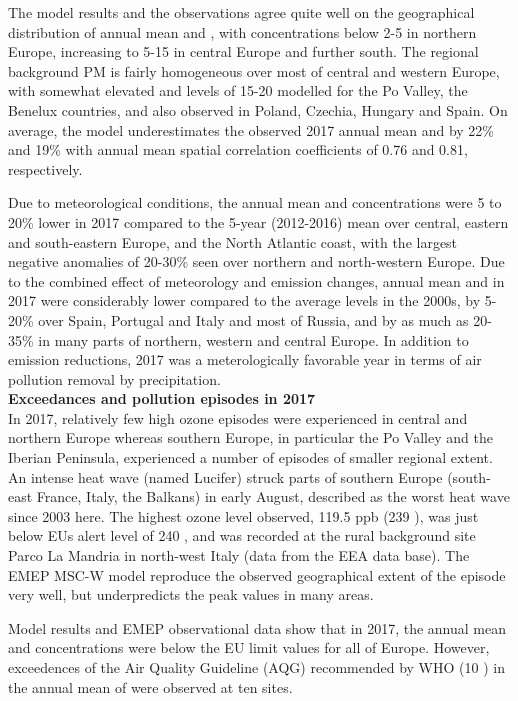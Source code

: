 The model results and the observations agree quite well on the geographical distribution of annual mean \PM[10] and
\PM[2.5], with concentrations below 2-5 \ug in northern Europe,
increasing to 5-15 \ug in central Europe and further south. The
regional background PM is fairly homogeneous over most of central and
western Europe, with somewhat elevated \PM[10] and \PM[2.5] levels of
15-20 \ug modelled for the Po Valley, the Benelux countries, and also observed
in Poland, Czechia, Hungary and Spain. On average, the model
underestimates the observed 2017 annual mean \PM[10] and \PM[2.5] by
22\% and 19\% with annual mean spatial correlation coefficients of 0.76 and 0.81,
respectively.

Due to meteorological conditions, the annual mean \PM[10] and \PM[2.5]
concentrations were 5 to 20\% lower in 2017 compared to the 5-year
(2012-2016) mean over central, eastern and south-eastern Europe, and
the North Atlantic coast, with the largest negative anomalies of
20-30\% seen over northern and north-western Europe. Due to the combined
effect of meteorology and emission changes, annual mean 
\PM[10] and \PM[2.5] in 2017 were considerably lower compared to the average
levels in the 2000s, by 5-20\% over Spain, Portugal and Italy and most
of Russia, and by as much as 20-35\% in many parts of northern,
western and central Europe. In addition to emission reductions, 
2017 was a meterologically favorable year in terms of air pollution
removal by precipitation.
\\

\noindent
\textbf{Exceedances and pollution episodes in 2017}\\  
In 2017, relatively few high ozone episodes were
experienced in central and northern Europe whereas southern Europe, in particular the Po Valley and the Iberian
Peninsula, experienced a number of episodes of smaller regional extent. An intense heat wave (named Lucifer) struck parts of southern Europe (south-east France, Italy, the Balkans) in early August, described as the worst heat wave since 2003 here. The highest ozone level observed, 119.5 ppb (239 \ug), was just below EUs alert level of 240 \ug, and was recorded at the rural background site Parco La Mandria in north-west Italy (data from the EEA data base).  The EMEP MSC-W model reproduce the observed geographical extent of the episode very well, but underpredicts the peak values in many areas.

Model results and EMEP observational data show that in 2017, the
annual mean \PM[10] and \PM[2.5] concentrations were below the EU
limit values for all of Europe. However, exceedences of the  Air Quality Guideline (AQG)
recommended by WHO (10 \ug) in the annual mean of \PM[2.5] were
observed at ten sites.

